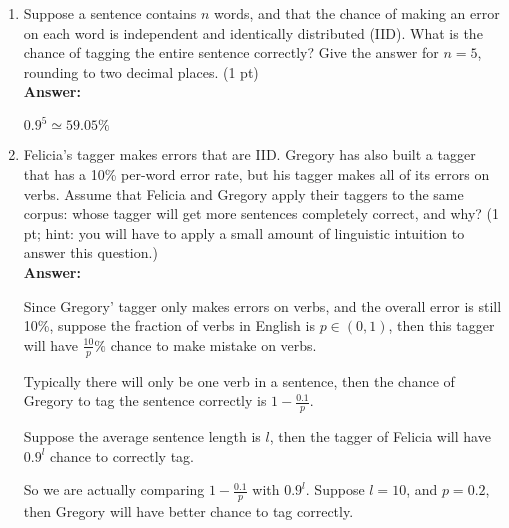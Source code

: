 \documentclass[twoside,11pt]{article}\usepackage{amsmath,amsfonts,amsthm,fullpage}
\begin{document}
	\begin{enumerate}
		\item Suppose a sentence contains $n$ words, and that the chance of making an error on each word is independent and identically distributed (IID). What is the chance of tagging the entire sentence correctly? Give the answer for $n = 5$, rounding to two decimal places. (1 pt)	\\
			\textbf{Answer:}
			
			$0.9^5 \simeq 59.05\% $
		\item Felicia’s tagger makes errors that are IID. Gregory has also built a tagger that has a 10\% per-word error rate, but his tagger makes all of its errors on verbs. Assume that Felicia and Gregory apply their taggers to the same corpus: whose tagger will get more sentences completely correct, and why? (1 pt; hint: you will have to apply a small amount of linguistic intuition to answer this question.) \\

			\textbf{Answer:}
			
			Since Gregory' tagger only makes errors on verbs, and the overall error is still 10\%, suppose the fraction of verbs in English is $p \in (0, 1)$, then this tagger will have $\frac{10}{p}\%$ chance to make mistake on verbs. 
			
			Typically there will only be one verb in a sentence, then the chance of Gregory to tag the sentence correctly is $1 - \frac{0.1}{p}$. 
			
			Suppose the average sentence length is $l$, then the tagger of Felicia will have $0.9^l$ chance to correctly tag. 
			
			So we are actually comparing $1 - \frac{0.1}{p}$ with $0.9^l$. Suppose $l=10$, and $p=0.2$, then Gregory will have better chance to tag correctly. 
			 
	\end{enumerate}
\end{document}
